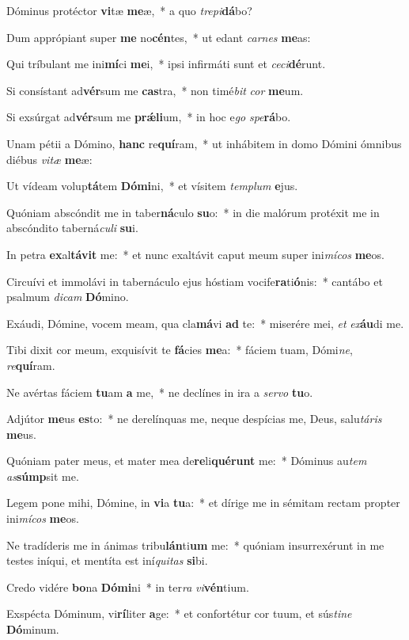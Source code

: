 \item Dóminus protéctor \textbf{vi}tæ \textbf{me}æ,~* a quo \textit{tre}\textit{pi}\textbf{dá}bo?
\item Dum apprópiant super \textbf{me} no\textbf{cén}tes,~* ut edant \textit{car}\textit{nes} \textbf{me}as:
\item Qui tríbulant me ini\textbf{mí}ci \textbf{me}i,~* ipsi infirmáti sunt et \textit{ce}\textit{ci}\textbf{dé}runt.
\item Si consístant ad\textbf{vér}sum me \textbf{cas}tra,~* non timé\textit{bit} \textit{cor} \textbf{me}um.
\item Si exsúrgat ad\textbf{vér}sum me \textbf{prǽ}\textbf{li}um,~* in hoc e\textit{go} \textit{spe}\textbf{rá}bo.
\item Unam pétii a Dómino, \textbf{hanc} re\textbf{quí}ram,~* ut inhábitem in domo Dómini ómnibus diébus \textit{vi}\textit{tæ} \textbf{me}æ:
\item Ut vídeam volup\textbf{tá}tem \textbf{Dó}\textbf{mi}ni,~* et vísitem \textit{tem}\textit{plum} \textbf{e}jus.
\item Quóniam abscóndit me in taber\textbf{ná}culo \textbf{su}o:~* in die malórum protéxit me in abscóndito taberná\textit{cu}\textit{li} \textbf{su}i.
\item In petra \textbf{ex}al\textbf{tá}\textbf{vit} me:~* et nunc exaltávit caput meum super ini\textit{mí}\textit{cos} \textbf{me}os.
\item Circuívi et immolávi in tabernáculo ejus hóstiam vocife\textbf{ra}ti\textbf{ó}nis:~* cantábo et psalmum \textit{di}\textit{cam} \textbf{Dó}mino.
\item Exáudi, Dómine, vocem meam, qua cla\textbf{má}vi \textbf{ad} te:~* miserére mei, \textit{et} \textit{ex}\textbf{áu}di me.
\item Tibi dixit cor meum, exquisívit te \textbf{fá}cies \textbf{me}a:~* fáciem tuam, Dómi\textit{ne}, \textit{re}\textbf{quí}ram.
\item Ne avértas fáciem \textbf{tu}am \textbf{a} me,~* ne declínes in ira a \textit{ser}\textit{vo} \textbf{tu}o.
\item Adjútor \textbf{me}us \textbf{es}to:~* ne derelínquas me, neque despícias me, Deus, salu\textit{tá}\textit{ris} \textbf{me}us.
\item Quóniam pater meus, et mater mea de\textbf{re}li\textbf{qué}\textbf{runt} me:~* Dóminus au\textit{tem} \textit{as}\textbf{súmp}sit me.
\item Legem pone mihi, Dómine, in \textbf{vi}a \textbf{tu}a:~* et dírige me in sémitam rectam propter ini\textit{mí}\textit{cos} \textbf{me}os.
\item Ne tradíderis me in ánimas tribu\textbf{lán}ti\textbf{um} me:~* quóniam insurrexérunt in me testes iníqui, et mentíta est iní\textit{qui}\textit{tas} \textbf{si}bi.
\item Credo vidére \textbf{bo}na \textbf{Dó}\textbf{mi}ni~* in ter\textit{ra} \textit{vi}\textbf{vén}tium.
\item Exspécta Dóminum, vi\textbf{rí}liter \textbf{a}ge:~* et confortétur cor tuum, et sús\textit{ti}\textit{ne} \textbf{Dó}minum.
